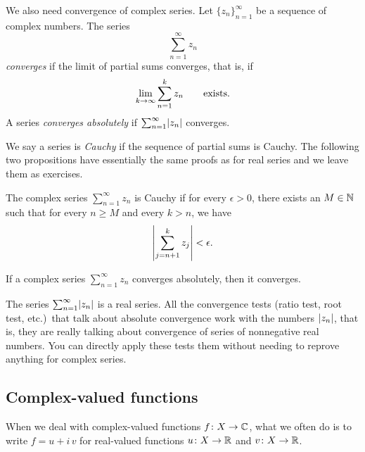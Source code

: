 We also need convergence of complex series.  Let $\{ z_n \}_{n=1}^\infty$ be a
sequence of complex
numbers. The series
\begin{equation*}
\sum_{n=1}^\infty z_n
\end{equation*}
\emph{converges} if the limit of partial sums converges, that is, if
\begin{equation*}
\lim_{k\to\infty} \sum_{n=1}^k z_n \qquad \text{exists.}
\avoidbreak
\end{equation*}
A series \emph{converges absolutely}
if $\sum_{n=1}^\infty \lvert {z_n} \rvert$ converges.

We say a series
is \emph{Cauchy}
if the sequence of partial sums is Cauchy.  The following two
propositions have essentially the same proofs as for real series and we
leave them as exercises.

\begin{prop} \label{prop:cachysercomplex}
The complex series $\sum_{n=1}^\infty z_n$ is Cauchy if for every $\epsilon > 0$, 
there exists an $M \in {\mathbb{N}}$ such that for every $n \geq M$
and every $k > n$, we have
\begin{equation*}
\left\lvert { \sum_{j={n+1}}^k z_j } \right\rvert
< \epsilon .
\end{equation*}
\end{prop}

\begin{prop} \label{prop:absconvmeansconv}
If a complex series $\sum_{n=1}^\infty z_n$ converges absolutely, then it converges.
\end{prop}

The series $\sum_{n=1}^\infty \lvert {z_n} \rvert$ is a real series.  All the
convergence tests (ratio test, root test, etc.)\ that talk about
absolute convergence work with the numbers $\lvert {z_n} \rvert$, that is, they
are really talking about convergence of series of nonnegative real
numbers.
You
can directly apply these tests
them without needing to reprove anything for complex
series.

\subsection{Complex-valued functions}

When we deal with complex-valued functions
$f \colon X \to {\mathbb{C}}$, what we often do is to write
$f = u+i\,v$ for real-valued functions $u \colon X \to {\mathbb{R}}$ and $v \colon X \to
{\mathbb{R}}$.

